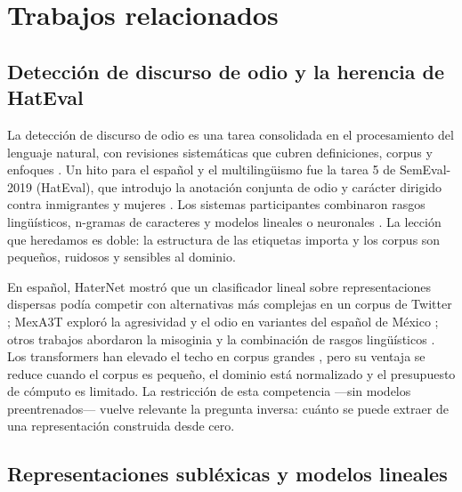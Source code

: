 \section{Trabajos relacionados}
\label{sec:trabajos}

\subsection{Detección de discurso de odio y la herencia de HatEval}

La detección de discurso de odio es una tarea consolidada en el procesamiento
del lenguaje natural, con revisiones sistemáticas que cubren definiciones,
corpus y enfoques \cite{schmidt2017survey,fortuna2018survey,jahan2023systematic}.
Un hito para el español y el multilingüismo fue la tarea 5 de SemEval-2019
(HatEval), que introdujo la anotación conjunta de odio y carácter dirigido
contra inmigrantes y mujeres \cite{basile2019hateval}. Los sistemas
participantes combinaron rasgos lingüísticos, n-gramas de caracteres y modelos
lineales o neuronales \cite{argotavega2019mineriaunam,ninaalcocer2019haterecognizer,plazadelarco2019sinai}.
La lección que heredamos es doble: la estructura de las etiquetas importa y
los corpus son pequeños, ruidosos y sensibles al dominio.

En español, HaterNet mostró que un clasificador lineal sobre representaciones
dispersas podía competir con alternativas más complejas en un corpus de
Twitter \cite{pereirakohatsu2019haternet}; MexA3T exploró la agresividad y el
odio en variantes del español de México \cite{alvarezcarmona2018mexa3t,aragon2019mexa3t};
otros trabajos abordaron la misoginia y la combinación de rasgos lingüísticos
\cite{garcia2021misogyny,garcia2022featurecombination,frenda2018misogyny,arango2019hate}.
Los transformers han elevado el techo en corpus grandes
\cite{plazadelarco2021comparing,plazadelarco2021multitask}, pero su ventaja se
reduce cuando el corpus es pequeño, el dominio está normalizado y el
presupuesto de cómputo es limitado. La restricción de esta competencia
---sin modelos preentrenados--- vuelve relevante la pregunta inversa: cuánto
se puede extraer de una representación construida desde cero.

\subsection{Representaciones subléxicas y modelos lineales}

